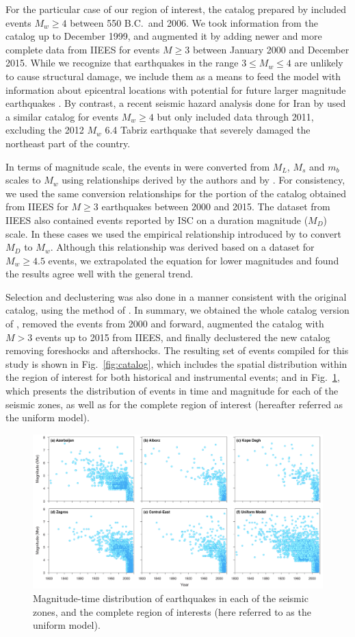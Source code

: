 For the particular case of our region of interest, the catalog prepared by \citet{Zare2014} included events $M_w \geq 4$ between 550 B.C.~and 2006. We took information from the catalog up to December 1999, and augmented it by adding newer and more complete data from IIEES for events $M \geq 3$ between January 2000 and December 2015. While we recognize that earthquakes in the range $3 \leq M_w \leq 4$ are unlikely to cause structural damage, we include them as a means to feed the model with information about epicentral locations with potential for future larger magnitude earthquakes \citep{Kafka_2000_BSSA}. By contrast, a recent seismic hazard analysis done for Iran by \citet{Khodaverdian_2016_BSSA} used a similar catalog for events $M_w \geq 4$ but only included data through 2011, excluding the 2012 $M_w$ 6.4 Tabriz earthquake that severely damaged the northeast part of the country.

In terms of magnitude scale, the events in \citet{Zare2014} were converted from $M_L$, $M_s$ and $m_b$ scales to $M_w$ using relationships derived by the authors and by \citet{Escordilis_2006_JS}. For consistency, we used the same conversion relationships for the portion of the catalog obtained from IIEES for $M \geq 3$ earthquakes between 2000 and 2015. The dataset from IIEES also contained events reported by ISC on a duration magnitude ($M_D$) scale. In these cases we used the empirical relationship introduced by \citet{Deniz2010} to convert $M_D$ to $M_w$. Although this relationship was derived based on a dataset for $M_w \geq 4.5$ events, we extrapolated the equation for lower magnitudes and found the results agree well with the general trend. 

Selection and declustering was also done in a manner consistent with the original catalog, using the method of \citet{Gardner1974}. In summary, we obtained the whole catalog version of \citet{Zare2014}, removed the events from 2000 and forward, augmented the catalog with $M>3$ events up to 2015 from IIEES, and finally declustered the new catalog removing foreshocks and aftershocks. The resulting set of events compiled for this study is shown in Fig.~\ref{fig:catalog}, which includes the spatial distribution within the region of interest for both historical and instrumental events; and in Fig.~\ref{fig:scatter}, which presents the distribution of events in time and magnitude for each of the seismic zones, as well as for the complete region of interest (hereafter referred as the uniform model).

\begin{figure} [t]
	\centering
	\includegraphics[width=\textwidth]{figures/pdf/figure-04}
	\caption{Magnitude-time distribution of earthquakes in each of the seismic zones, and the complete region of interests (here referred to as the uniform model).}
	\label{fig:scatter}
\end{figure}
